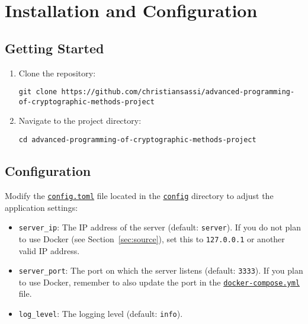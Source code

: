 \chapter{Installation and Configuration}
\label{cha:Installation}

\section{Getting Started}

\begin{enumerate}
    \item Clone the repository:

        \begin{lstlisting}
git clone https://github.com/christiansassi/advanced-programming-of-cryptographic-methods-project
        \end{lstlisting}

    \item Navigate to the project directory:
    
        \begin{lstlisting}
cd advanced-programming-of-cryptographic-methods-project
        \end{lstlisting}
\end{enumerate}

\section{Configuration}

Modify the \href{https://github.com/christiansassi/advanced-programming-of-cryptographic-methods-project/blob/main/config/config.toml}{\texttt{config.toml}} file located in the \href{https://github.com/christiansassi/advanced-programming-of-cryptographic-methods-project/blob/main/config}{\texttt{config}} directory to adjust the application settings:

\begin{itemize}
    \item \texttt{server\_ip}: The IP address of the server (default: \texttt{server}). If you do not plan to use Docker (see Section~\ref{sec:source}), set this to \texttt{127.0.0.1} or another valid IP address.
    \item \texttt{server\_port}: The port on which the server listens (default: \texttt{3333}). If you plan to use Docker, remember to also update the port in the \href{https://github.com/christiansassi/advanced-programming-of-cryptographic-methods-project/blob/main/docker-compose.yml#L23}{\texttt{docker-compose.yml}} file.
    \item \texttt{log\_level}: The logging level (default: \texttt{info}).
\end{itemize}

